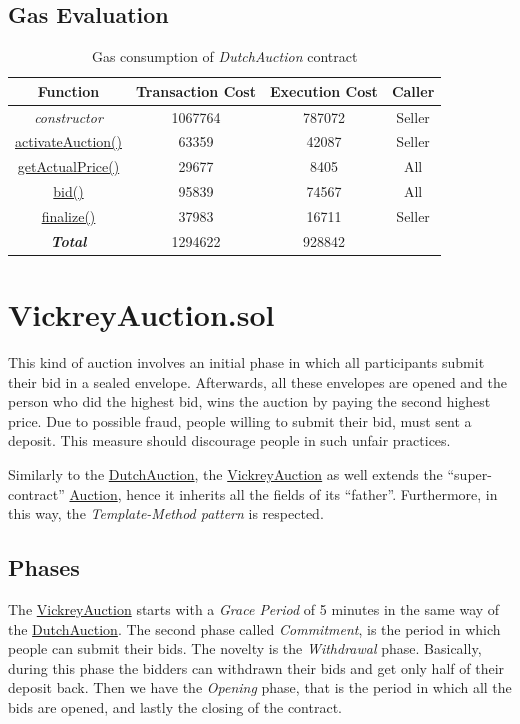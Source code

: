 \documentclass[runningheads,a4paper]{llncs}
\begin{document}
\subsection{Gas Evaluation}

\begin{table}
\setlength{\tabcolsep}{10pt}
\setlength{\abovecaptionskip}{10pt}
\centering
\begin{tabular}{| c | c | c | c |} 
 \hline
 \textbf{Function} & \textbf{Transaction Cost} & \textbf{Execution Cost} & \textbf{Caller} \\
 \hline
 \emph{constructor} & 1067764 & 787072 & Seller \\ 
 \hline
 \url{activateAuction()} & 63359 & 42087 & Seller \\ 
 \hline
 \url{getActualPrice()} & 29677 & 8405 & All \\ 
 \hline
 \url{bid()} & 95839 & 74567 & All \\ 
 \hline
 \url{finalize()} & 37983 & 16711 & Seller \\
 \hline
 \hline
 \hline
 \textbf{\emph{Total}} & 1294622 & 928842 & \\ \hline
\end{tabular}
\caption{Gas consumption of \emph{DutchAuction} contract}
\label{table:1}
\end{table}



\newpage
\section{VickreyAuction.sol}
This kind of auction involves an initial phase in which all participants submit their bid in a sealed envelope. Afterwards, all these envelopes are opened and the person who did the highest bid, wins the auction by paying the second highest price. Due to possible fraud, people willing to submit their bid, must sent a deposit. This measure should discourage people in such unfair practices.

Similarly to the \url{DutchAuction}, the \url{VickreyAuction} as well extends the ``super-contract'' \url{Auction}, hence it inherits all the fields of its ``father''. Furthermore, in this way, the \emph{Template-Method pattern} is respected.  


\subsection{Phases}
The \url{VickreyAuction} starts with a \emph{Grace Period} of 5 minutes in the same way of the \url{DutchAuction}. The second phase called \emph{Commitment}, is the period in which people can submit their bids. The novelty is the \emph{Withdrawal} phase. Basically, during this phase the bidders can withdrawn their bids and get only half of their deposit back. Then we have the \emph{Opening} phase, that is the period in which all the bids are opened, and lastly the closing of the contract.
\end{document}
